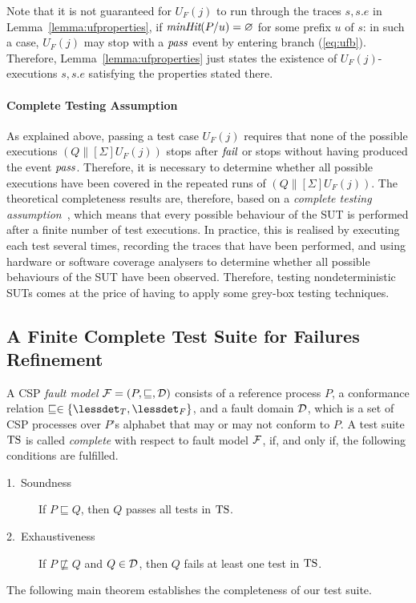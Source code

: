 %
Note that it is not guaranteed for $U_F(j)$ to run through the traces $s,
s.e$ in Lemma~\ref{lemma:ufproperties}, if $\text{\it minHit}(P/u) = \varnothing$ for
some prefix $u$ of $s$: in such a case, $U_F(j)$ may stop with a ${\text{\it pass}}$
event by entering branch (\ref{eq:ufb}). Therefore,
Lemma~\ref{lemma:ufproperties} just states the existence of
$U_F(j)$-executions $s, s.e$ satisfying the properties stated there.

\paragraph{Complete Testing Assumption} As explained above, passing a test case
$U_F(j)$ requires that none of the possible executions $(Q\parallel[\Sigma]
U_F(j))$ stops after ${\text{\it fail}}$ or stops without having produced the event
${\text{\it pass}}$. Therefore, it is necessary to determine whether all possible
executions have been covered in the repeated runs of $(Q\parallel[\Sigma]
U_F(j))$. The theoretical completeness results are, therefore, based on a
\emph{complete testing
assumption}~\cite{hierons_testing_2004,DBLP:conf/icfem/CavalcantiG07}, which
means that every possible behaviour of the SUT is performed after a finite
number of test executions. In practice, this is realised by executing each
test several times, recording the traces that have been performed, and using
hardware or software coverage analysers to determine whether all possible
behaviours of the SUT have been observed. Therefore, testing nondeterministic
SUTs comes at the price of having to apply some grey-box testing techniques.

\subsection{A Finite Complete Test Suite for Failures Refinement}

A CSP \emph{fault model} ${\cal F} = (P,\sqsubseteq,{\cal D})$ consists of a
reference process $P$, a conformance relation $\sqsubseteq \in \{\lessdet_T,
\lessdet_F\}$, and a fault domain ${\cal D}$, which is a set of CSP processes
over $P$'s alphabet that may or may not conform to $P$. A test suite ${\text{TS}}$ is
called \emph{complete} with respect to fault model ${\cal F}$, if, and only
if, the following conditions are fulfilled.
\begin{description}
\item[1.~Soundness] If $P \sqsubseteq Q$, then $Q$ passes all tests in ${\text{TS}}$.
\item[2.~Exhaustiveness] If $P \not\sqsubseteq Q$ and $Q\in{\cal D}$,
then $Q$ fails at least one test in ${\text{TS}}$.
\end{description}
%
The following main theorem establishes the completeness of our test suite.


